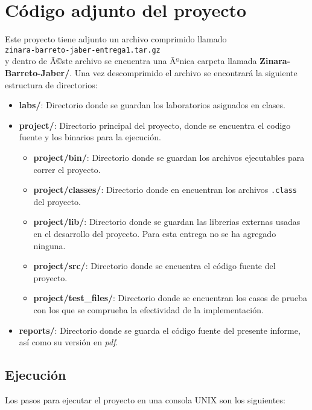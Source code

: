 \documentclass[12pt, spanish]{report}
\begin{document}
\section{C\'odigo adjunto del proyecto}
\label{sec:correr}

Este proyecto tiene adjunto un archivo comprimido llamado\\

\texttt{zinara-barreto-jaber-entrega1.tar.gz}\\

y dentro de Ã©ste archivo se encuentra una Ãºnica carpeta llamada
\textbf{Zinara-Barreto-Jaber/}. Una vez descomprimido el archivo se
encontrar\'a la siguiente estructura de directorios:

\begin{itemize}
 \item \textbf{labs/}: Directorio donde se guardan los laboratorios
       asignados en clases.
 \item \textbf{project/}: Directorio principal del proyecto, donde se
       encuentra el codigo fuente y los binarios para la ejecuci\'on.
 \begin{itemize}
  \item \textbf{project/bin/}: Directorio donde se guardan los
	archivos ejecutables para correr el proyecto.
  \item \textbf{project/classes/}: Directorio donde en encuentran los
	archivos \texttt{.class} del proyecto.
  \item \textbf{project/lib/}: Directorio donde se guardan las
	librerias externas usadas en el desarrollo del proyecto. Para esta
	entrega no se ha agregado ninguna.
  \item \textbf{project/src/}: Directorio donde se encuentra el c\'odigo
	fuente del proyecto.
  \item \textbf{project/test\_files/}: Directorio donde se encuentran los
	casos de prueba con los que se comprueba la efectividad de la implementaci\'on.
 \end{itemize}
 \item \textbf{reports/}: Directorio donde se guarda el c\'odigo fuente
       del presente informe, as\'i como su versi\'on en \emph{pdf}.
\end{itemize}

  \subsection{Ejecuci\'on}
  \label{sec:zejecucion}
  Los pasos para ejecutar el proyecto en una consola UNIX son los
  siguientes:
  
\end{document}
